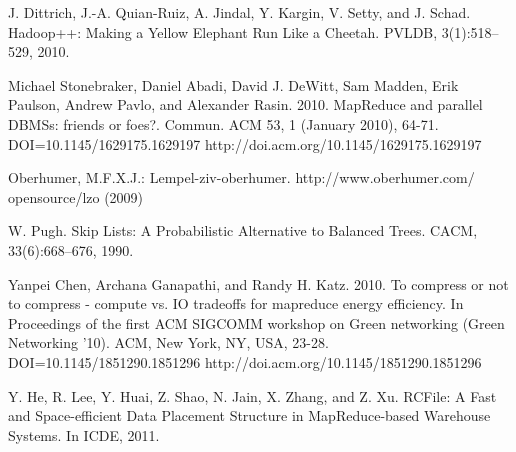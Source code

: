 \documentclass[twocolumn]{article}
\begin{document}
{\begin{thebibliography}{10}
 J. Dittrich, J.-A. Quian-Ruiz, A. Jindal, Y. Kargin,
                V. Setty, and J. Schad. Hadoop++: Making a Yellow
                Elephant Run Like a Cheetah. PVLDB, 3(1):518–529, 2010.\

 Michael Stonebraker, Daniel Abadi, David J. DeWitt, Sam Madden,
                Erik Paulson, Andrew Pavlo, and Alexander Rasin. 2010.
                MapReduce and parallel DBMSs: friends or foes?. Commun.
                ACM 53, 1 (January 2010), 64-71. DOI=10.1145/1629175.1629197
                http://doi.acm.org/10.1145/1629175.1629197

 Oberhumer, M.F.X.J.: Lempel-ziv-oberhumer. http://www.oberhumer.com/
		opensource/lzo (2009)

 W. Pugh. Skip Lists: A Probabilistic Alternative to
        	Balanced Trees. CACM, 33(6):668–676, 1990.

 Yanpei Chen, Archana Ganapathi, and Randy H. Katz. 2010. To compress
                or not to compress - compute vs. IO tradeoffs for mapreduce
                energy efficiency. In Proceedings of the first ACM SIGCOMM
                workshop on Green networking (Green Networking '10). ACM,
                New York, NY, USA, 23-28. DOI=10.1145/1851290.1851296
                http://doi.acm.org/10.1145/1851290.1851296

 Y. He, R. Lee, Y. Huai, Z. Shao, N. Jain, X. Zhang, and
        	Z. Xu. RCFile: A Fast and Space-efficient Data Placement
        	Structure in MapReduce-based Warehouse Systems. In ICDE, 2011.

\end{thebibliography}
}
\end{document}
